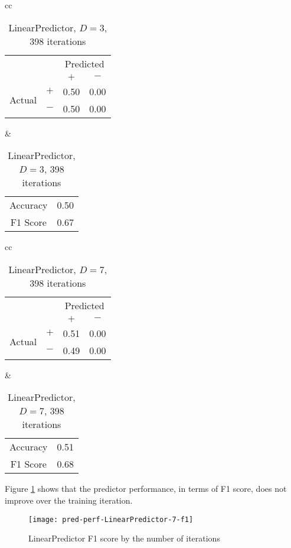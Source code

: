 \documentclass[twocolumn,10pt]{asme2ej}
\begin{document}
\begin{table}
  \begin{tabular}{cc}
    \begin{tabular}{cc|cc}
      & & \multicolumn{2}{c}{Predicted} \\
      & & $+ $ & $-$ \\
      \hline
      \multirow{2}{*}{Actual}
      & $+$ & 0.50 & 0.00 \\
      & $-$ & 0.50 & 0.00 \\
      \hline
    \end{tabular}
    &
    \begin{tabular}{cc}
      Accuracy & 0.50 \\
      F1 Score & 0.67 \\
    \end{tabular}
  \end{tabular}
  \caption{LinearPredictor, $D=3$, 398 iterations}
  \label{pred-perf-LinearPredictor-3-398}
\end{table}


\begin{table}
  \begin{tabular}{cc}
    \begin{tabular}{cc|cc}
      & & \multicolumn{2}{c}{Predicted} \\
      & & $+ $ & $-$ \\
      \hline
      \multirow{2}{*}{Actual}
      & $+$ & 0.51 & 0.00 \\
      & $-$ & 0.49 & 0.00 \\
      \hline
    \end{tabular}
    &
    \begin{tabular}{cc}
      Accuracy & 0.51 \\
      F1 Score & 0.68 \\
    \end{tabular}
  \end{tabular}
  \caption{LinearPredictor, $D=7$, 398 iterations}
  \label{pred-perf-LinearPredictor-7-398}
\end{table}

Figure \ref{pred-perf-LinearPredictor-7-f1} shows that the predictor
performance, in terms of F1 score, does not improve over the training
iteration. 

\begin{figure}
  \centering
  \texttt{[image: pred-perf-LinearPredictor-7-f1]}
  \caption{LinearPredictor F1 score by the number of iterations}
  \label{pred-perf-LinearPredictor-7-f1}
\end{figure}
\end{document}
